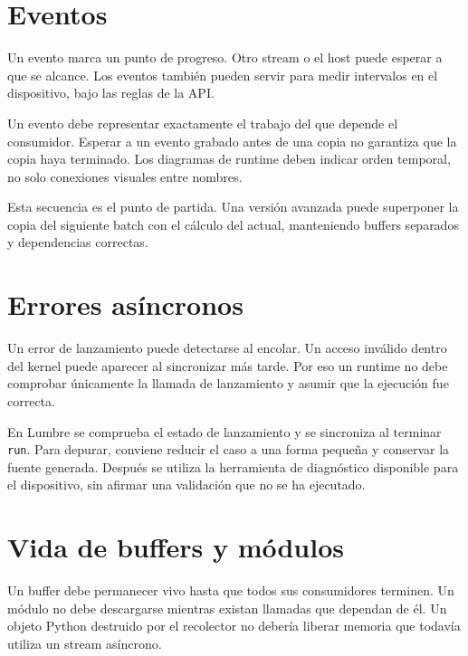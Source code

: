 \documentclass[12pt,a4paper,oneside]{report}
\begin{document}
\section{Eventos}
Un evento marca un punto de progreso. Otro stream o el host puede esperar a que se alcance. Los eventos también pueden servir para medir intervalos en el dispositivo, bajo las reglas de la API.

Un evento debe representar exactamente el trabajo del que depende el consumidor. Esperar a un evento grabado antes de una copia no garantiza que la copia haya terminado. Los diagramas de runtime deben indicar orden temporal, no solo conexiones visuales entre nombres.

\begin{center}
\end{center}
Esta secuencia es el punto de partida. Una versión avanzada puede superponer la copia del siguiente batch con el cálculo del actual, manteniendo buffers separados y dependencias correctas.

\section{Errores asíncronos}
Un error de lanzamiento puede detectarse al encolar. Un acceso inválido dentro del kernel puede aparecer al sincronizar más tarde. Por eso un runtime no debe comprobar únicamente la llamada de lanzamiento y asumir que la ejecución fue correcta.

En Lumbre se comprueba el estado de lanzamiento y se sincroniza al terminar \texttt{run}. Para depurar, conviene reducir el caso a una forma pequeña y conservar la fuente generada. Después se utiliza la herramienta de diagnóstico disponible para el dispositivo, sin afirmar una validación que no se ha ejecutado.

\section{Vida de buffers y módulos}
Un buffer debe permanecer vivo hasta que todos sus consumidores terminen. Un módulo no debe descargarse mientras existan llamadas que dependan de él. Un objeto Python destruido por el recolector no debería liberar memoria que todavía utiliza un stream asíncrono.
\end{document}
